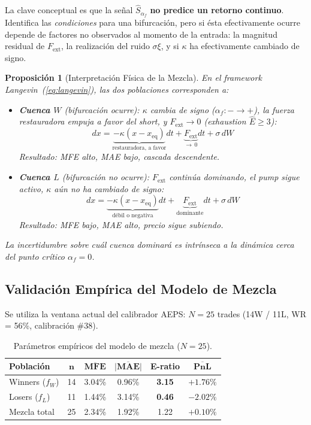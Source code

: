 \documentclass[11pt,a4paper]{article}
\newtheorem{proposition}{Proposici\'on}[section]
\newcommand{\af}{\alpha_f}
\newcommand{\score}{\hat{S}_{\alpha_f}}
\newcommand{\exh}{\hat{E}}
\begin{document}
La clave conceptual es que la se\~nal $\score$ \textbf{no predice
un retorno continuo}. Identifica las \textit{condiciones} para una
bifurcaci\'on, pero si \'esta efectivamente ocurre depende de
factores no observados al momento de la entrada: la magnitud
residual de $F_{\text{ext}}$, la realizaci\'on del ruido $\sigma\xi$,
y si $\kappa$ ha efectivamente cambiado de signo.

\begin{proposition}[Interpretaci\'on F\'isica de la Mezcla]
\label{prop:physics}
En el framework Langevin~(\ref{eq:langevin}), las dos poblaciones
corresponden a:
\begin{itemize}[leftmargin=1.5em]
\item \textbf{Cuenca $W$} (bifurcaci\'on ocurre): $\kappa$ cambia de
  signo ($\af: {-} \to {+}$), la fuerza restauradora empuja a favor
  del short, y $F_{\text{ext}} \to 0$ (exhaustion $\exh \geq 3$):
  \begin{equation}
  dx = \underbrace{-\kappa(x - x_{\text{eq}})}_{\text{restauradora, a favor}} dt
    + \underbrace{F_{\text{ext}}}_{\to\,0} dt + \sigma\,dW
  \end{equation}
  Resultado: MFE alto, MAE bajo, cascada descendente.

\item \textbf{Cuenca $L$} (bifurcaci\'on no ocurre): $F_{\text{ext}}$
  contin\'ua dominando, el pump sigue activo, $\kappa$ a\'un no ha
  cambiado de signo:
  \begin{equation}
  dx = \underbrace{-\kappa(x - x_{\text{eq}})}_{\text{d\'ebil o negativa}} dt
    + \underbrace{F_{\text{ext}}}_{\text{dominante}} dt + \sigma\,dW
  \end{equation}
  Resultado: MFE bajo, MAE alto, precio sigue subiendo.
\end{itemize}
La incertidumbre sobre cu\'al cuenca dominar\'a es intr\'inseca a la
din\'amica cerca del punto cr\'itico $\af = 0$.
\end{proposition}


\subsection{Validaci\'on Emp\'irica del Modelo de Mezcla}

Se utiliza la ventana actual del calibrador AEPS: $N = 25$ trades
(14W / 11L, WR = 56\%, calibraci\'on \#38).

\begin{table}[H]
\centering
\caption{Par\'ametros emp\'iricos del modelo de mezcla ($N=25$).}
\label{tab:mixture_params}
\begin{tabular}{lccccc}
\toprule
\textbf{Poblaci\'on} & $\bm{n}$ & $\overline{\textbf{MFE}}$ &
  $\overline{|\textbf{MAE}|}$ & \textbf{E-ratio} & $\overline{\textbf{PnL}}$ \\
\midrule
Winners ($f_W$) & 14 & 3.04\% & 0.96\% & \textbf{3.15} & $+1.76\%$ \\
Losers ($f_L$) & 11 & 1.44\% & 3.14\% & \textbf{0.46} & $-2.02\%$ \\
\midrule
Mezcla total & 25 & 2.34\% & 1.92\% & 1.22 & $+0.10\%$ \\
\bottomrule
\end{tabular}
\end{table}
\end{document}

